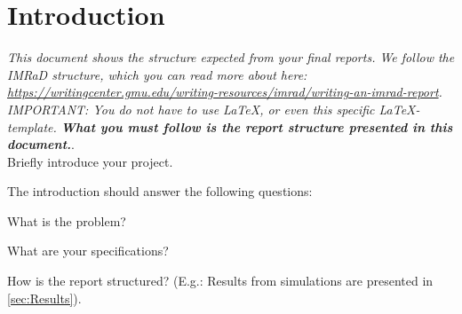 \section{Introduction}

\textit{This document shows the structure expected from your final reports. We follow the IMRaD structure, which you can read more about here: \url{https://writingcenter.gmu.edu/writing-resources/imrad/writing-an-imrad-report}.\\ IMPORTANT: You do not have to use \LaTeX, or even this specific \LaTeX-template. \textbf{What you must follow is the report structure presented in this document.}}.\\

Briefly introduce your project. 

The introduction should answer the following questions:

\quad What is the problem?

\quad What are your specifications?


\quad How is the report structured? (E.g.: Results from simulations are presented in \autoref{sec:Results}).
